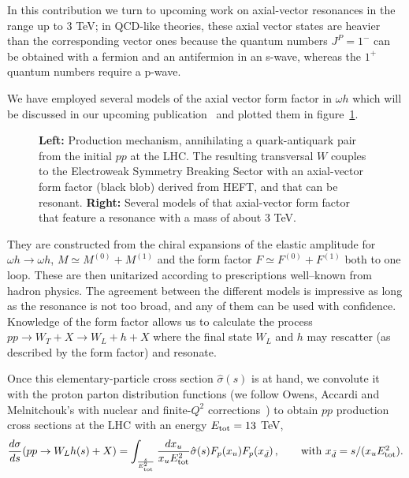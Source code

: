 \documentclass{PoS}
\begin{document}
In this contribution we turn to upcoming work on  axial-vector resonances in the range up to 3 TeV; in QCD-like theories, these axial vector states are heavier than the corresponding vector ones because the quantum numbers $J^P=1^-$ can be obtained with a fermion and an antifermion in an s-wave, whereas the $1^+$ quantum numbers require a p-wave.

We have employed several models of the axial vector form factor in $\omega h$ which will be discussed in our upcoming publication~\cite{Cilleroprep} and plotted them in figure~\ref{fig:FFs}. 

\begin{figure}
\centering
{}
\caption{\label{fig:FFs} {\small {\bf Left:} Production mechanism, annihilating a quark-antiquark pair from the initial $pp$ at the LHC. The resulting transversal $W$ couples to the Electroweak Symmetry Breaking Sector with an axial-vector form factor (black blob) derived from HEFT, and that can be resonant. {\bf Right:} Several models of that axial-vector form factor that feature a resonance with a mass of about 3 TeV.}}
\end{figure}
\noindent They are constructed from the chiral expansions of the elastic amplitude for $\omega h\to \omega h$, $M\simeq M^{(0)} + M^{(1)}$ and the form factor $F\simeq F^{(0)} + F^{(1)}$ both to one loop. These are then unitarized according to prescriptions well--known from hadron physics. 
The agreement between the different models is impressive as long as the resonance is not too broad, and any of them can be used with confidence.
Knowledge of the form factor allows us to calculate the process $pp \to W_T + X\to W_L +h + X$ where the final state $W_L$ and $h$ may rescatter (as described by the form factor) and resonate.

Once this elementary-particle cross section $\hat{\sigma}(s)$ is at hand, we convolute it with the 
proton parton distribution functions 
(we follow Owens, Accardi and Melnitchouk's with nuclear and finite-$Q^2$ corrections~\cite{Owens:2012bv}) to obtain $pp$ production cross sections at the LHC with an energy $E_{\rm tot}=13$ TeV,
\begin{equation} \label{ppintermediateW}
\frac{d\sigma}{ds}(pp\to W_Lh(s)+X) = \int_\frac{s}{E^2_{\rm tot}} \frac{dx_u}{x_u E^2_{\rm tot}} \hat{\sigma}(s) F_p(x_u)
F_p(x_{\bar{d}}) 
\, , 
\qquad \mbox{with $x_{\bar{d}} = s/(x_uE^2_{\rm tot})$.}
\end{equation}
\end{document}
